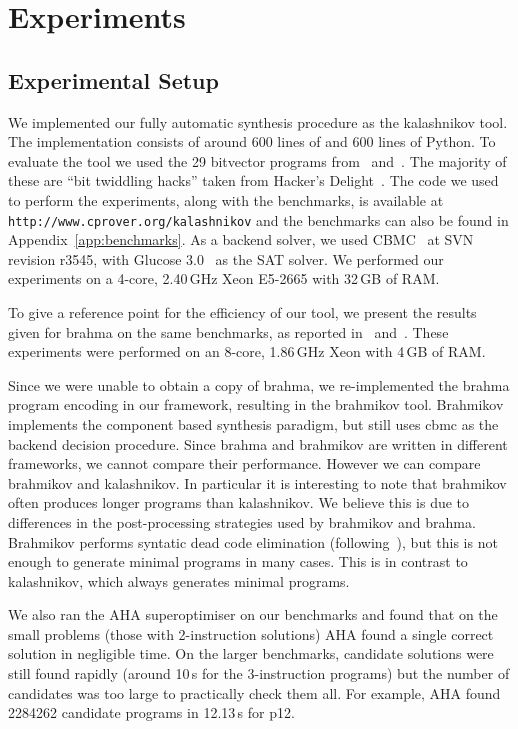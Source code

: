 \iffalse
\section{Experiments}
\label{sec:experiments}
\subsection{Experimental Setup}
We implemented our fully automatic synthesis procedure as the {\sc kalashnikov} tool.  The implementation consists
of around 600 lines of \newC and 600 lines of Python.  To evaluate the tool we used the 29 bitvector
programs from~\cite{brahma} and~\cite{brahma-icse}.  The majority of these are ``bit twiddling hacks'' taken from
Hacker's Delight~\cite{hackers-delight}.  The code we used to perform the experiments, along with the
benchmarks, is available at \texttt{http://www.cprover.org/kalashnikov} and the benchmarks can also
be found in Appendix~\ref{app:benchmarks}.  As a backend solver, we used
{\sc CBMC}~\cite{cbmc-website} at SVN revision r3545, with Glucose 3.0~\cite{glucose-paper} as the SAT solver.
We performed our experiments on a 4-core, 2.40\,GHz Xeon E5-2665 with 32\,GB of RAM.

To give a reference point for the efficiency of our tool, we present the results given for {\sc brahma}
on the same benchmarks, as reported in~\cite{brahma} and~\cite{brahma-icse}.
These experiments were performed on an 8-core,
1.86\,GHz Xeon with 4\,GB of RAM.

Since we were unable to obtain a copy of {\sc brahma}, we re-implemented the {\sc brahma} program encoding in our framework,
resulting in the {\sc brahmikov} tool. {\sc Brahmikov} implements the component based synthesis
paradigm, but still uses {\sc cbmc} as the backend decision procedure.  Since {\sc brahma} and {\sc brahmikov} are written in
different frameworks, we cannot compare their performance.  However we can compare {\sc brahmikov} and {\sc kalashnikov}.
In particular it is interesting to note that {\sc brahmikov} often produces longer programs than {\sc kalashnikov}.  We
believe this is due to differences in the post-processing strategies used by {\sc brahmikov} and {\sc brahma}.  {\sc Brahmikov}
performs syntatic dead code elimination (following~\cite{brahma}), but this is not enough to generate minimal programs
in many cases.  This is in contrast to {\sc kalashnikov}, which always generates minimal programs.

We also ran the {\sc AHA} superoptimiser on our benchmarks and found that on the small problems
(those with 2-instruction solutions)
{\sc AHA} found a single correct solution in negligible time.  On the larger benchmarks, candidate solutions
were still found rapidly (around 10\,s for the 3-instruction programs) but the number of candidates was
too large to practically check them all.  For example, {\sc AHA} found 2284262 candidate
programs in 12.13\,s for p12.

